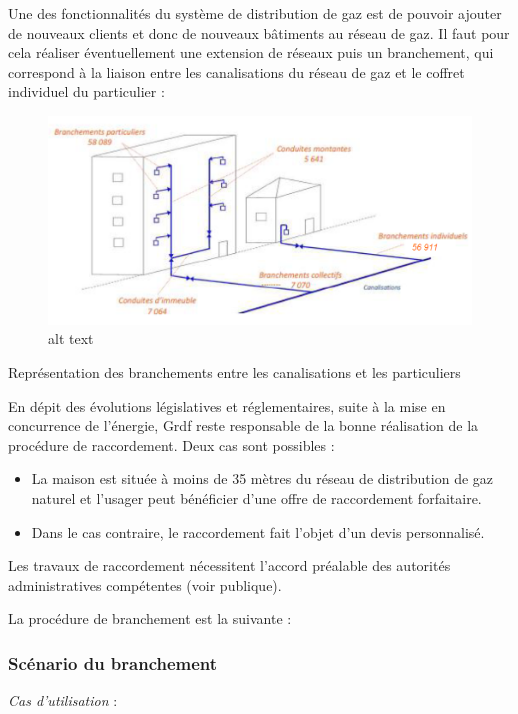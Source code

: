 \documentclass[
12pt,
french,                           %
a4paper,
]{article}
\begin{document}
Une des fonctionnalités du système de distribution de gaz est de pouvoir
ajouter de nouveaux clients et donc de nouveaux bâtiments au réseau de
gaz. Il faut pour cela réaliser éventuellement une extension de réseaux
puis un branchement, qui correspond à la liaison entre les canalisations
du réseau de gaz et le coffret individuel du particulier :

\begin{figure}[htbp]
\centering
\includegraphics{branchementparticulier.png}
\caption{alt text}
\end{figure}

Représentation des branchements entre les canalisations et les
particuliers

En dépit des évolutions législatives et réglementaires, suite à la mise
en concurrence de l'énergie, Grdf reste responsable de la bonne
réalisation de la procédure de raccordement. Deux cas sont possibles :

\begin{itemize}
\item
  La maison est située à moins de 35 mètres du réseau de distribution de
  gaz naturel et l'usager peut bénéficier d'une offre de raccordement
  forfaitaire.
\item
  Dans le cas contraire, le raccordement fait l'objet d'un devis
  personnalisé.
\end{itemize}

Les travaux de raccordement nécessitent l'accord préalable des autorités
administratives compétentes (voir publique).

La procédure de branchement est la suivante :

\subsubsection{Scénario du branchement}

\emph{Cas d'utilisation} :
\end{document}
